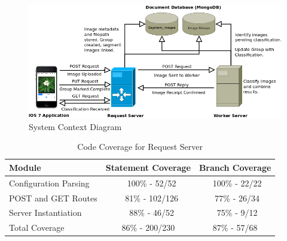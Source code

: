 \documentclass[a4paper,11pt]{article}
\begin{document}
\begin{figure}[h!]
  \centering
  \includegraphics[width=1\linewidth]{SystemContextDiagram.png}
  \caption{System Context Diagram}
  \label{fig:systemcontextdiagram}
\end{figure}

\begin{table}[h]
   \centering
    \begin{tabular}{|l|cc|}
    \hline
    Module                 & Statement Coverage  & Branch Coverage \\ \hline
    Configuration Parsing  & ~   100\% - 52/52   & ~100\% - 22/22     \\
    POST and GET Routes    & ~   81\%  - 102/126   & ~77\%  - 26/34      \\
    Server Instantiation   & ~   88\%  - 46/52   & ~75\%  - 9/12     \\
    \hline
    Total Coverage         &     86\%  - 200/230 & 87\%   - 57/68	\\      
    \hline
    \end{tabular}
    \caption {Code Coverage for Request Server}
\end{table}

\clearpage
\end{document}
